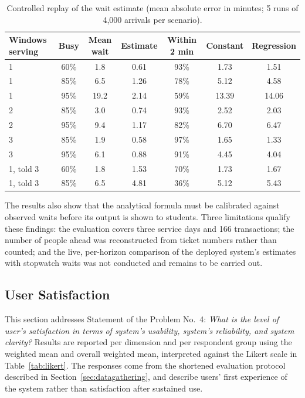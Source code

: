 \documentclass{research}
\begin{document}
\begin{table}[!htbp]
\centering
\small
\caption[Controlled replay of the wait estimate]{Controlled replay of the wait estimate (mean absolute error in
minutes; 5 runs of 4,000 arrivals per scenario).}
\label{tab:wait-replay}
\begin{tabular}{lcccccc}
\hline
Windows serving & Busy & Mean wait & Estimate & Within 2 min & Constant & Regression \\
\hline
1 & 60\% & 1.8 & 0.61 & 93\% & 1.73 & 1.51 \\
1 & 85\% & 6.5 & 1.26 & 78\% & 5.12 & 4.58 \\
1 & 95\% & 19.2 & 2.14 & 59\% & 13.39 & 14.06 \\
2 & 85\% & 3.0 & 0.74 & 93\% & 2.52 & 2.03 \\
2 & 95\% & 9.4 & 1.17 & 82\% & 6.70 & 6.47 \\
3 & 85\% & 1.9 & 0.58 & 97\% & 1.65 & 1.33 \\
3 & 95\% & 6.1 & 0.88 & 91\% & 4.45 & 4.04 \\
\hline
1, told 3 & 60\% & 1.8 & 1.53 & 70\% & 1.73 & 1.67 \\
1, told 3 & 85\% & 6.5 & 4.81 & 36\% & 5.12 & 5.43 \\
\hline
\end{tabular}
\end{table}

The results also show that the analytical formula must be
calibrated against observed waits before its output is shown to
students. Three limitations qualify these findings: the evaluation covers three service
days and 166 transactions; the number of people ahead was reconstructed
from ticket numbers rather than counted; and the live, per-horizon
comparison of the deployed system's estimates with stopwatch waits was
not conducted and remains to be carried out.

\subsection{User Satisfaction}
\label{sec:sop4-results}

This section addresses Statement of the Problem No.~4: \emph{What is
the level of user's satisfaction in terms of system's usability,
system's reliability, and system clarity?} Results are reported per
dimension and per respondent group using the weighted mean and overall
weighted mean, interpreted against the Likert scale in
Table~\ref{tab:likert}. The responses come from the shortened evaluation
protocol described in Section~\ref{sec:datagathering}, and describe
users' first experience of the system rather than satisfaction after
sustained use.
\end{document}
